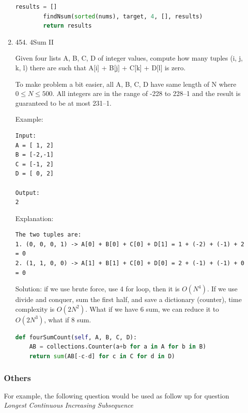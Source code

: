 \documentclass[../specific-algorithms.tex]{subfiles}
\begin{document}
\begin{enumerate}
\begin{lstlisting}[language = Python]
results = []
        findNsum(sorted(nums), target, 4, [], results)
        return results
\end{lstlisting}

\item 454. 4Sum II

Given four lists A, B, C, D of integer values, compute how many tuples (i, j, k, l) there are such that A[i] + B[j] + C[k] + D[l] is zero.

To make problem a bit easier, all A, B, C, D have same length of N where $0 \leq N \leq 500$. All integers are in the range of -228 to 228–1 and the result is guaranteed to be at most 231–1.

Example:
\begin{lstlisting}
Input:
A = [ 1, 2]
B = [-2,-1]
C = [-1, 2]
D = [ 0, 2]

Output:
2
\end{lstlisting}

Explanation:

\begin{lstlisting}
The two tuples are:
1. (0, 0, 0, 1) -> A[0] + B[0] + C[0] + D[1] = 1 + (-2) + (-1) + 2 = 0
2. (1, 1, 0, 0) -> A[1] + B[1] + C[0] + D[0] = 2 + (-1) + (-1) + 0 = 0
\end{lstlisting}
Solution: if we use brute force, use 4 for loop, then it is $O(N^4)$. If we use divide and conquer, sum the first half, and save a dictionary (counter), time complexity is $O(2N^2)$. What if we have 6 sum, we can reduce it to $O(2N^3)$, what if 8 sum.

\begin{lstlisting}[language = Python]
def fourSumCount(self, A, B, C, D):
    AB = collections.Counter(a+b for a in A for b in B)
    return sum(AB[-c-d] for c in C for d in D)
\end{lstlisting}
\end{enumerate}
\subsubsection{Others}
For example, the following question would be used as follow up for question \textit{Longest Continuous Increasing Subsequence}
\end{document}
